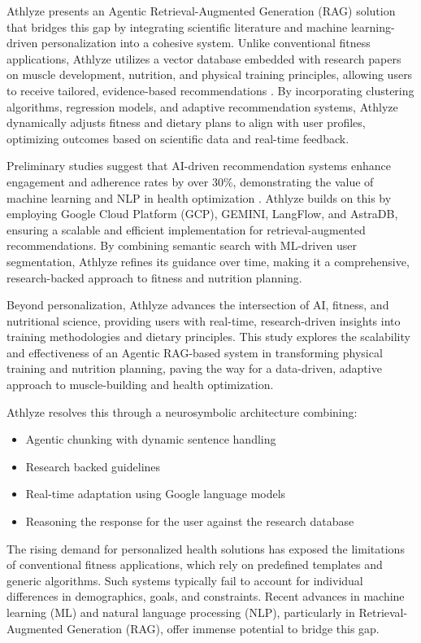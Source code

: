 \documentclass[conference]{IEEEtran}
\begin{document}
Athlyze presents an Agentic Retrieval-Augmented Generation (RAG) solution that bridges this gap by integrating scientific literature and machine learning-driven personalization into a cohesive system. Unlike conventional fitness applications, Athlyze utilizes a vector database embedded with research papers on muscle development, nutrition, and physical training principles, allowing users to receive tailored, evidence-based recommendations \cite{5}. By incorporating clustering algorithms, regression models, and adaptive recommendation systems, Athlyze dynamically adjusts fitness and dietary plans to align with user profiles, optimizing outcomes based on scientific data and real-time feedback.

Preliminary studies suggest that AI-driven recommendation systems enhance engagement and adherence rates by over 30\%, demonstrating the value of machine learning and NLP in health optimization \cite{10}. Athlyze builds on this by employing Google Cloud Platform (GCP), GEMINI, LangFlow, and AstraDB, ensuring a scalable and efficient implementation for retrieval-augmented recommendations. By combining semantic search with ML-driven user segmentation, Athlyze refines its guidance over time, making it a comprehensive, research-backed approach to fitness and nutrition planning.

Beyond personalization, Athlyze advances the intersection of AI, fitness, and nutritional science, providing users with real-time, research-driven insights into training methodologies and dietary principles. This study explores the scalability and effectiveness of an Agentic RAG-based system in transforming physical training and nutrition planning, paving the way for a data-driven, adaptive approach to muscle-building and health optimization.

Athlyze resolves this through a neurosymbolic architecture combining:

\begin{itemize}
    \item Agentic chunking with dynamic sentence handling
    \item Research backed guidelines
    \item Real-time adaptation using Google language models
    \item Reasoning the response for the user against the research database
\end{itemize}

The rising demand for personalized health solutions has exposed the limitations of conventional fitness applications, which rely on predefined templates and generic algorithms. Such systems typically fail to account for individual differences in demographics, goals, and constraints. Recent advances in machine learning (ML) and natural language processing (NLP), particularly in Retrieval-Augmented Generation (RAG), offer immense potential to bridge this gap.
\end{document}
